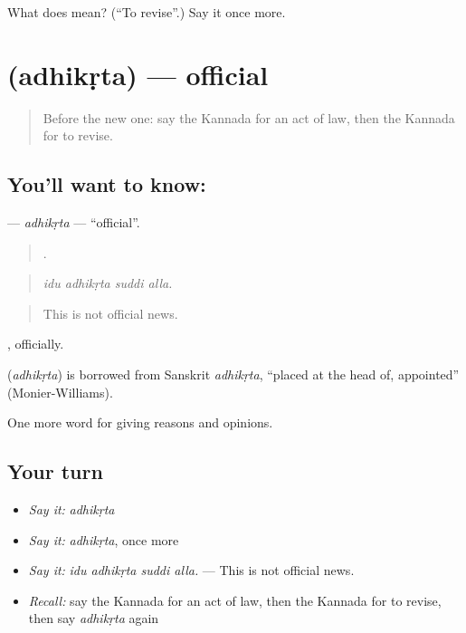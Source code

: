 \begin{tcolorbox}[breakable,colback=teal!4,colframe=teal!35!black,title={Before you move on}]
What does  mean? (\textquotedblleft{}To revise\textquotedblright{}.) Say it once more.
\end{tcolorbox}
\section[\texorpdfstring{\kn{ಅಧಿಕೃತ} (adhikṛta)}{ಅಧಿಕೃತ (adhikṛta)}]{ (adhikṛta) — official}

\label{lesson:KA-C390-adhikrta}



\begin{quote}
Before the new one: say the Kannada for an act of law, then the Kannada for to revise.
\end{quote}

\subsection*{You'll want to know: }
\textbf{} — \emph{adhikṛta} — \textquotedblleft{}official\textquotedblright{}.

\begin{quote}
   .
\end{quote}

\begin{quote}
\emph{idu adhikṛta suddi alla.}
\end{quote}

\begin{quote}
This is not official news.
\end{quote}

, officially.

\begin{cousinweb}
\textbf{} (\emph{adhikṛta}) is borrowed from Sanskrit \emph{adhikṛta}, \textquotedblleft{}placed at the head of, appointed\textquotedblright{} (Monier-Williams).
\end{cousinweb}

\begin{grammarlens}[title={What you've built}]
One more word for giving reasons and opinions.
\end{grammarlens}

\subsection*{Your turn}
\begin{itemize}
\raggedright
  \item \emph{Say it:} \emph{adhikṛta}
  \item \emph{Say it:} \emph{adhikṛta}, once more
  \item \emph{Say it:} \emph{idu adhikṛta suddi alla.} — This is not official news.
  \item \emph{Recall:} say the Kannada for an act of law, then the Kannada for to revise, then say \emph{adhikṛta} again
\end{itemize}

